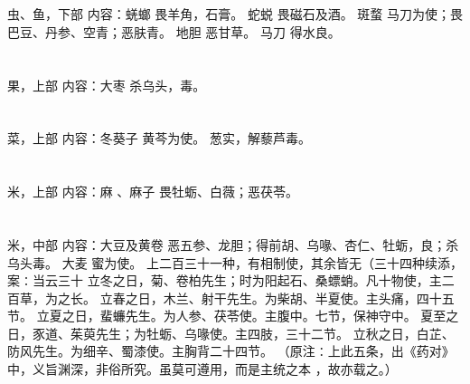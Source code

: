 \documentclass[12pt,UTF8]{ctexbook}
\begin{document}
\chapter{}虫、鱼，下部
内容：蜣螂 畏羊角，石膏。 
蛇蜕 畏磁石及酒。 
斑蝥 马刀为使；畏巴豆、丹参、空青；恶肤青。 
地胆 恶甘草。 
马刀 得水良。 


\chapter{}果，上部
内容：大枣 杀乌头，毒。 


\chapter{}菜，上部
内容：冬葵子 黄芩为使。 
葱实，解藜芦毒。 


\chapter{}米，上部
内容：麻 、麻子 畏牡蛎、白薇；恶茯苓。 


\chapter{}米，中部
内容：大豆及黄卷 恶五参、龙胆；得前胡、乌喙、杏仁、牡蛎，良；杀乌头毒。 
大麦 蜜为使。 
上二百三十一种，有相制使，其余皆无（三十四种续添，案∶当云三十 
立冬之日，菊、卷柏先生；时为阳起石、桑螵蛸。凡十物使，主二百草，为之长。 
立春之日，木兰、射干先生。为柴胡、半夏使。主头痛，四十五节。 
立夏之日，蜚蠊先生。为人参、茯苓使。主腹中。七节，保神守中。 
夏至之日，豕道、茱萸先生；为牡蛎、乌喙使。主四肢，三十二节。 
立秋之日，白芷、防风先生。为细辛、蜀漆使。主胸背二十四节。 
（原注∶上此五条，出《药对》中，义旨渊深，非俗所究。虽莫可遵用，而是主统之本 
，故亦载之。） 
\end{document}
